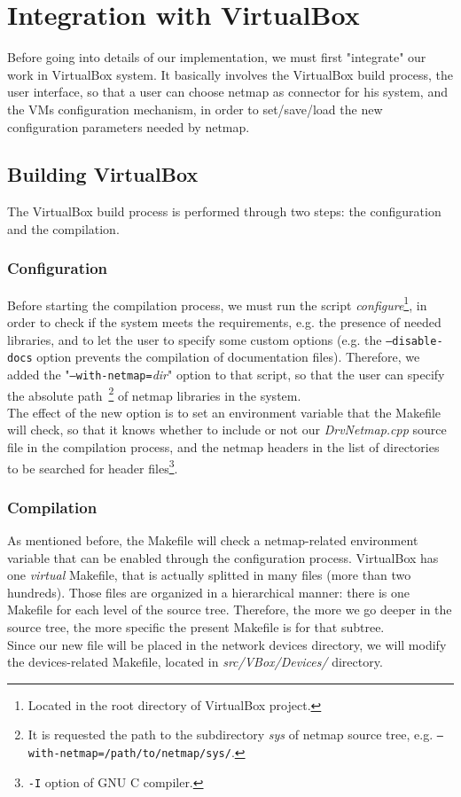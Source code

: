\documentclass[a4paper, 12pt, titlepage]{report}
\begin{document}
\section{Integration with VirtualBox}
Before going into details of our implementation, we must first "integrate" our work in VirtualBox system. It basically involves the VirtualBox build process, the user interface, so that a user can choose netmap as connector for his system, and the VMs configuration mechanism, in order to set/save/load the new configuration parameters needed by netmap.

\subsection{Building VirtualBox}
The VirtualBox build process is performed through two steps: the configuration and the compilation.

\subsubsection{Configuration}
Before starting the compilation process, we must run the script \textit{configure}\footnote{Located in the root directory of VirtualBox project.}, in order to check if the system meets the requirements, e.g. the presence of needed libraries, and to let the user to specify some custom options (e.g. the \texttt{--disable-docs} option prevents the compilation of documentation files). Therefore, we added the "\texttt{--with-netmap=}\textit{dir}" option to that script, so that the user can specify the absolute path~\footnote{It is requested the path to the subdirectory \textit{sys} of netmap source tree, e.g. \texttt{--with-netmap=/path/to/netmap/sys/}.} of netmap libraries in the system.
\\
The effect of the new option is to set an environment variable that the Makefile will check, so that it knows whether to include or not our \textit{DrvNetmap.cpp} source file in the compilation process, and the netmap headers in the list of directories to be searched for header files\footnote{\texttt{-I} option of GNU C compiler.}.

\subsubsection{Compilation}
As mentioned before, the Makefile will check a netmap-related environment variable that can be enabled through the configuration process. VirtualBox has one \textit{virtual} Makefile, that is actually splitted in many files (more than two hundreds). Those files are organized in a hierarchical manner: there is one Makefile for each level of the source tree. Therefore, the more we go deeper in the source tree, the more specific the present Makefile is for that subtree.
\\
Since our new file will be placed in the network devices directory, we will modify the devices-related Makefile, located in \textit{src/VBox/Devices/} directory.
\end{document}

